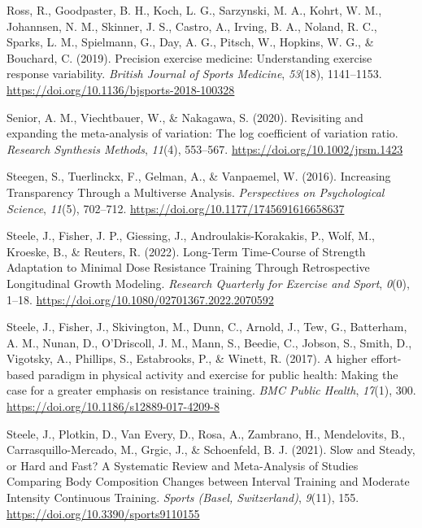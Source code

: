 \documentclass[
]{article}
\newlength{\cslhangindent}
\newlength{\cslentryspacingunit} %
\newenvironment{CSLReferences}[2] %
 {%
  \setlength{\parindent}{0pt}
  \ifodd #1
  \let\oldpar\par
  \def\par{\hangindent=\cslhangindent\oldpar}
  \fi
  \setlength{\parskip}{#2\cslentryspacingunit}
 }%
 {}
\begin{document}
\begin{CSLReferences}{1}{0}
\leavevmode{}%
Ross, R., Goodpaster, B. H., Koch, L. G., Sarzynski, M. A., Kohrt, W. M., Johannsen, N. M., Skinner, J. S., Castro, A., Irving, B. A., Noland, R. C., Sparks, L. M., Spielmann, G., Day, A. G., Pitsch, W., Hopkins, W. G., \& Bouchard, C. (2019). Precision exercise medicine: Understanding exercise response variability. \emph{British Journal of Sports Medicine}, \emph{53}(18), 1141--1153. \url{https://doi.org/10.1136/bjsports-2018-100328}

\leavevmode{}%
Senior, A. M., Viechtbauer, W., \& Nakagawa, S. (2020). Revisiting and expanding the meta-analysis of variation: {The} log coefficient of variation ratio. \emph{Research Synthesis Methods}, \emph{11}(4), 553--567. \url{https://doi.org/10.1002/jrsm.1423}

\leavevmode{}%
Steegen, S., Tuerlinckx, F., Gelman, A., \& Vanpaemel, W. (2016). Increasing {Transparency} {Through} a {Multiverse} {Analysis}. \emph{Perspectives on Psychological Science}, \emph{11}(5), 702--712. \url{https://doi.org/10.1177/1745691616658637}

\leavevmode{}%
Steele, J., Fisher, J. P., Giessing, J., Androulakis-Korakakis, P., Wolf, M., Kroeske, B., \& Reuters, R. (2022). Long-{Term} {Time}-{Course} of {Strength} {Adaptation} to {Minimal} {Dose} {Resistance} {Training} {Through} {Retrospective} {Longitudinal} {Growth} {Modeling}. \emph{Research Quarterly for Exercise and Sport}, \emph{0}(0), 1--18. \url{https://doi.org/10.1080/02701367.2022.2070592}

\leavevmode{}%
Steele, J., Fisher, J., Skivington, M., Dunn, C., Arnold, J., Tew, G., Batterham, A. M., Nunan, D., O'Driscoll, J. M., Mann, S., Beedie, C., Jobson, S., Smith, D., Vigotsky, A., Phillips, S., Estabrooks, P., \& Winett, R. (2017). A higher effort-based paradigm in physical activity and exercise for public health: Making the case for a greater emphasis on resistance training. \emph{BMC Public Health}, \emph{17}(1), 300. \url{https://doi.org/10.1186/s12889-017-4209-8}

\leavevmode{}%
Steele, J., Plotkin, D., Van Every, D., Rosa, A., Zambrano, H., Mendelovits, B., Carrasquillo-Mercado, M., Grgic, J., \& Schoenfeld, B. J. (2021). Slow and {Steady}, or {Hard} and {Fast}? {A} {Systematic} {Review} and {Meta}-{Analysis} of {Studies} {Comparing} {Body} {Composition} {Changes} between {Interval} {Training} and {Moderate} {Intensity} {Continuous} {Training}. \emph{Sports (Basel, Switzerland)}, \emph{9}(11), 155. \url{https://doi.org/10.3390/sports9110155}


\end{CSLReferences}
\end{document}

